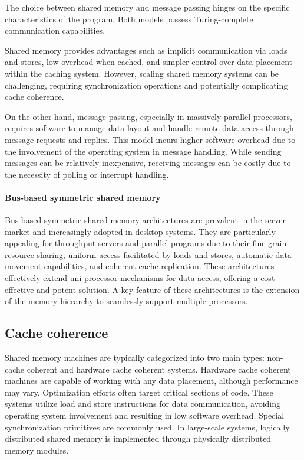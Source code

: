 The choice between shared memory and message passing hinges on the specific characteristics of the program. 
Both models possess Turing-complete communication capabilities.

Shared memory provides advantages such as implicit communication via loads and stores, low overhead when cached, and simpler control over data placement within the caching system. 
However, scaling shared memory systems can be challenging, requiring synchronization operations and potentially complicating cache coherence.

On the other hand, message passing, especially in massively parallel processors, requires software to manage data layout and handle remote data access through message requests and replies.
This model incurs higher software overhead due to the involvement of the operating system in message handling. 
While sending messages can be relatively inexpensive, receiving messages can be costly due to the necessity of polling or interrupt handling.

\paragraph*{Bus-based symmetric shared memory}
Bus-based symmetric shared memory architectures are prevalent in the server market and increasingly adopted in desktop systems. 
They are particularly appealing for throughput servers and parallel programs due to their fine-grain resource sharing, uniform access facilitated by loads and stores, automatic data movement capabilities, and coherent cache replication. 
These architectures effectively extend uni-processor mechanisms for data access, offering a cost-effective and potent solution. 
A key feature of these architectures is the extension of the memory hierarchy to seamlessly support multiple processors.

\subsection{Cache coherence}
Shared memory machines are typically categorized into two main types: non-cache coherent and hardware cache coherent systems.
Hardware cache coherent machines are capable of working with any data placement, although performance may vary. 
Optimization efforts often target critical sections of code. 
These systems utilize load and store instructions for data communication, avoiding operating system involvement and resulting in low software overhead. 
Special synchronization primitives are commonly used. 
In large-scale systems, logically distributed shared memory is implemented through physically distributed memory modules.

